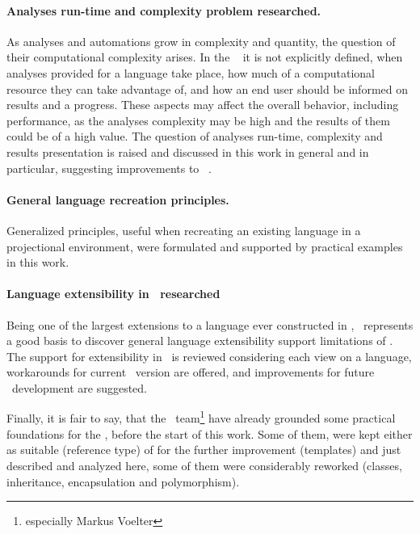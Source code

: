  \paragraph{Analyses run-time and complexity problem researched.} As analyses and automations grow in complexity and quantity, the question of their computational complexity arises.
In the \jbmps\  it is not explicitly defined, when analyses provided for a language take place, 
how much of a computational resource they can take advantage of, and how an end user should be informed on results and a progress. 
These aspects may affect the overall  behavior, including performance, as the analyses complexity may be high and the results of them could 
be of a high value. The question of analyses run-time, complexity and results presentation is raised and discussed in 
this work in general and in particular, suggesting improvements to \jbmps\ .

 \paragraph{General language recreation principles.} Generalized principles, useful when recreating an existing language in a projectional 
 environment, were formulated and supported by practical examples in this work.
 
 \paragraph{Language extensibility in \jbmps\ researched} Being one of the largest extensions to a language ever constructed in \jbmps, \pcpp\ 
 represents a good basis to discover general language extensibility support limitations of \jbmps. The support for extensibility in \jbmps\ is 
 reviewed considering each view on a language, workarounds for current \jbmps\ version are offered, and improvements for future \jbmps\ development
 are suggested.
 
 \vspace{10 mm}
 
Finally, it is fair to say, that the \mbdr\ team\footnote{especially Markus Voelter} have already grounded some practical foundations for the \pcpp, 
before the start of this work. Some of them, were kept either as suitable (reference type) of for the further improvement (templates) and just described and analyzed 
here, some of them were considerably reworked (classes, inheritance, encapsulation and polymorphism). 


